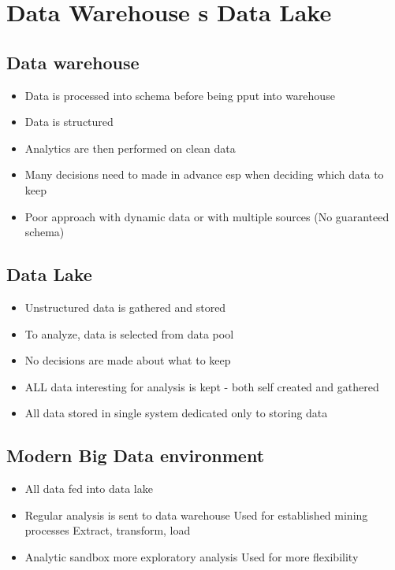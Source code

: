 \documentclass[10pt,a4paper]{scrreprt}
\begin{document}
\section{Data Warehouse s Data Lake}
\subsection{Data warehouse}
\begin{itemize}
	\item Data is processed into schema before being pput into warehouse
	\item Data is structured
	\item Analytics are then performed on clean data
	\item Many decisions need to made in advance esp when deciding which data to keep
	\item Poor approach with dynamic data or with multiple sources (No guaranteed schema)
\end{itemize}

\subsection{Data Lake}
\begin{itemize}
	\item Unstructured data is gathered and stored
	\item To analyze, data is selected from data pool
	\item No decisions are made about what to keep
	\item ALL data interesting for analysis is kept - both self created and gathered
	\item All data stored in single system dedicated only to storing data
\end{itemize}

\subsection{Modern Big Data environment}
\begin{itemize}
	\item All data fed into data lake
	\item Regular analysis is sent to data warehouse
	\subitem Used for established mining processes
	\subitem Extract, transform, load
	\item Analytic sandbox
	\subitem more exploratory analysis
	\subitem Used for more flexibility
\end{itemize}
\end{document}
